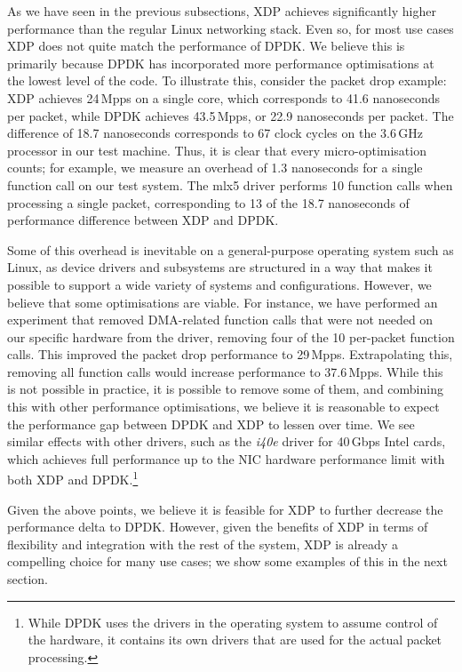 \documentclass[sigconf]{acmart}
\begin{document}
As we have seen in the previous subsections, XDP achieves significantly higher
performance than the regular Linux networking stack. Even so, for most use cases
XDP does not quite match the performance of DPDK. We believe this is primarily
because DPDK has incorporated more performance optimisations at the lowest level
of the code. To illustrate this, consider the packet drop example: XDP achieves
24\,Mpps on a single core, which corresponds to 41.6 nanoseconds per packet,
while DPDK achieves 43.5\,Mpps, or 22.9 nanoseconds per packet. The difference
of 18.7 nanoseconds corresponds to 67 clock cycles on the 3.6\,GHz processor in
our test machine. Thus, it is clear that every micro-optimisation counts; for
example, we measure an overhead of 1.3 nanoseconds for a single function call on
our test system. The mlx5 driver performs 10 function calls when processing a
single packet, corresponding to 13 of the 18.7 nanoseconds of performance
difference between XDP and DPDK.

Some of this overhead is inevitable on a general-purpose operating system such
as Linux, as device drivers and subsystems are structured in a way that makes it
possible to support a wide variety of systems and configurations. However, we
believe that some optimisations are viable. For instance, we have performed an
experiment that removed DMA-related function calls that were not needed on our
specific hardware from the driver, removing four of the 10 per-packet function
calls. This improved the packet drop performance to 29\,Mpps. Extrapolating
this, removing all function calls would increase performance to 37.6\,Mpps.
While this is not possible in practice, it is possible to remove some of them,
and combining this with other performance optimisations, we believe it is
reasonable to expect the performance gap between DPDK and XDP to lessen over
time. We see similar effects with other drivers, such as the \emph{i40e} driver
for 40\,Gbps Intel cards, which achieves full performance up to the NIC hardware
performance limit with both XDP and DPDK.\footnote{While DPDK uses the drivers
  in the operating system to assume control of the hardware, it contains its own
  drivers that are used for the actual packet processing.}
%

Given the above points, we believe it is feasible for XDP to further decrease
the performance delta to DPDK. However, given the benefits of XDP in terms of
flexibility and integration with the rest of the system, XDP is already a
compelling choice for many use cases; we show some examples of this in the next
section.
\end{document}
